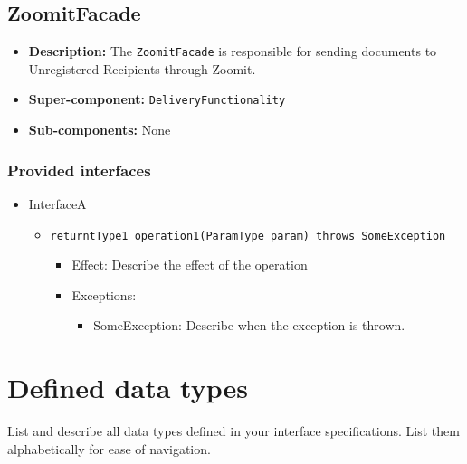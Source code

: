 \documentclass[a4paper,10pt]{article}
\begin{document}
\subsection{ZoomitFacade}
\begin{itemize}
    \item \textbf{Description:} The \texttt{ZoomitFacade} is responsible for sending documents to Unregistered Recipients through Zoomit.
    \item \textbf{Super-component:} \texttt{DeliveryFunctionality}
    \item \textbf{Sub-components:} None
\end{itemize}

\subsubsection*{Provided interfaces}
\begin{itemize}
    \item InterfaceA
    \begin{itemize}
        \item \texttt{returntType1 operation1(ParamType param) throws SomeException}
        \begin{itemize}
            \item Effect: Describe the effect of the operation
            \item Exceptions:
            \begin{itemize}
                \item SomeException: Describe when the exception is thrown.
            \end{itemize}
		\end{itemize}
    \end{itemize}
\end{itemize}



\section{Defined data types}\label{app:datatypes}
List and describe all data types defined in your interface specifications. List
them alphabetically for ease of navigation.
\end{document}
